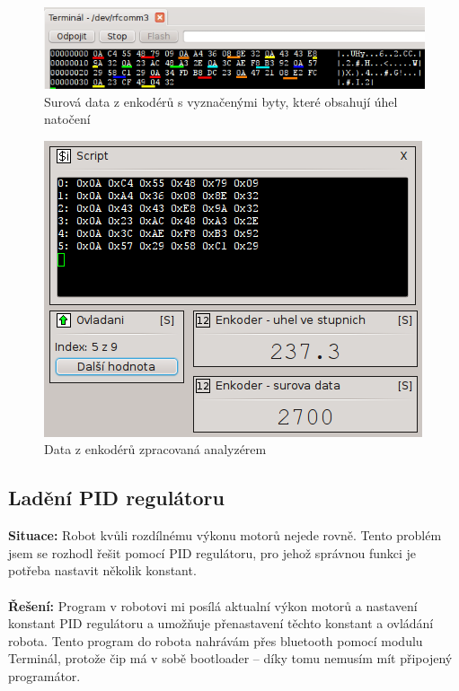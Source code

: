 \documentclass[12pt, a4paper, oneside]{article}
\begin{document}
\begin{figure}[h]
\begin{center}
\includegraphics{img/use_enc_term.png}
\caption{Surová data z enkodérů s vyznačenými byty, které obsahují úhel natočení}
\label{Terminal}
\end{center}
\end{figure}

\begin{figure}[h]
\begin{center}
\includegraphics{img/use_enc_analyzer.png}
\caption{Data z enkodérů zpracovaná analyzérem}
\label{Terminal}
\end{center}
\end{figure}

\newpage
\subsection{Ladění PID regulátoru}
{\bf Situace:} Robot kvůli rozdílnému výkonu motorů nejede rovně. Tento problém jsem se rozhodl řešit pomocí PID regulátoru, pro jehož správnou funkci je potřeba nastavit několik konstant. \\
\\
{\bf Řešení:} Program v robotovi mi posílá aktualní výkon motorů a nastavení konstant PID regulátoru a umožňuje přenastavení těchto konstant a ovládání robota. Tento program do robota nahrávám přes bluetooth pomocí modulu Terminál, protože čip má v sobě bootloader -- díky tomu nemusím mít připojený programátor.  
\end{document}
